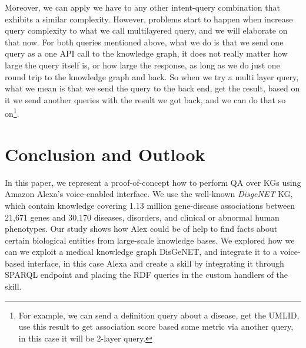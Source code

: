 \documentclass[10pt,journal,compsoc]{IEEEtran}
\begin{document}
Moreover, we can apply we have to any other intent-query combination that exhibits a similar complexity. However, problems start to happen when increase query complexity to what we call multilayered query, and we will elaborate on that now. For both queries mentioned above, what we do is that we send one query as a one API call to the knowledge graph, it does not really matter how large the query itself is, or how large the response, as long as we do just one round trip to the knowledge graph and back. So when we try a multi layer query, what we mean is that we send the query to the back end, get the result, based on it we send another queries with the result we got back, and we can do that so on\footnote{For example, we can send a definition query about a disease, get the UMLID, use this result to get association score based some metric via another query, in this case it will be 2-layer query.}.  

\section{Conclusion and Outlook}\label{sec:con}
\noindent In this paper, we represent a proof-of-concept how to perform QA over KGs using Amazon Alexa's voice-enabled interface. We use the well-known \emph{DisgeNET} KG, which contain knowledge covering 1.13 million gene-disease associations between 21,671 genes and 30,170 diseases, disorders, and clinical or abnormal human phenotypes. Our study shows how Alex could be of help to find facts about certain biological entities from large-scale knowledge bases. We explored how we can we exploit a medical knowledge graph DisGeNET, and integrate it to a voice-based interface, in this case Alexa and create a skill by integrating it through SPARQL endpoint and placing the RDF queries in the custom handlers of the skill.



        
\end{document}
